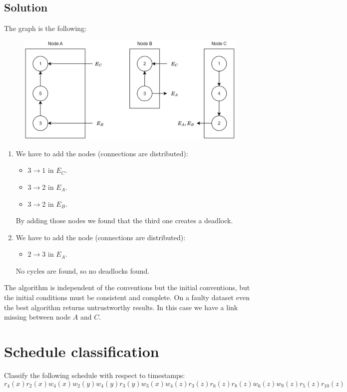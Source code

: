 \documentclass[12pt, a4paper]{report}
\newtheorem[style=M,bodystyle=\normalfont]{theorem}{Theorem}
\newtheorem[style=M,bodystyle=\normalfont]{corollary}{Corollary}
\newtheorem[style=M,bodystyle=\normalfont]{lemma}{Lemma}
\newtheorem[style=M,bodystyle=\normalfont]{definition}{Definition}
\begin{document}
    \subsection*{Solution}
        The graph is the following: 
        \begin{figure}[H]
            \centering
            \includegraphics[width=0.75\linewidth]{images/Ob4.png}
        \end{figure}
        \begin{enumerate}
            \item We have to add the nodes (connections are distributed): 
                \begin{itemize}
                    \item $3 \rightarrow 1$ in $E_C$. 
                    \item $3 \rightarrow 2$ in $E_A$. 
                    \item $3 \rightarrow 2$ in $E_B$. 
                \end{itemize}
                By adding those nodes we found that the third one creates a deadlock. 
            \item We have to add the node (connections are distributed): 
                \begin{itemize}
                    \item $2 \rightarrow 3$ in $E_A$. 
                \end{itemize}
                No cycles are found, so no deadlocks found. 
        \end{enumerate}
        The algorithm is independent of the conventions but the initial conventions, but the initial conditions must be consistent and complete. 
        On a faulty dataset even the best algorithm returns untrustworthy results. In this case we have a link missing between node $A$ and $C$.

    \newpage

    \section{Schedule classification}
        Classify the following schedule with respect to timestamps: 
        \[r_4(x) r_2(x) w_4(x) w_2(y) w_4(y) r_3(y) w_3(x) w_4(z) r_3(z) r_6(z) r_8(z) w_6(z) w_9(z) r_5(z) r_{10}(z)\]
\end{document}
